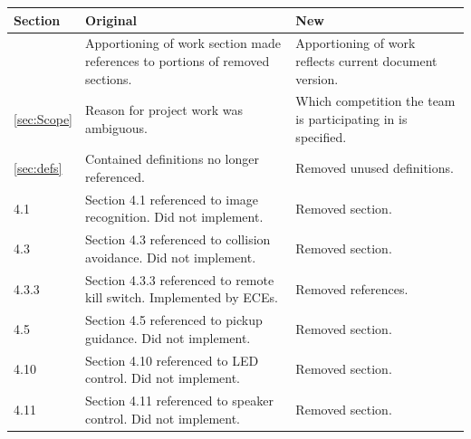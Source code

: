 \documentclass[onecolumn, oneside, letterpaper, draftclsnofoot, 10pt, compsoc]{IEEEtran}
\begin{document}
\begin{titlepage}
\begin{singlespace}
\begin{abstract}
        This design document outlines the overall software architecture of Oregon State University\textquotesingle s Micro Air Vehicle (MAV) system. It outlines the data the software will receive from the MAV\textquotesingle s onboard transmitter. Next, the document covers how the received data is processed, organized, and used by each software block. The data pipeline is described in detail, from the origin source, through each sorting and processing step, and finally to useful information displayed for pilot consumption. The design and layout of the GUI is also discussed, including the value of the displayed information to the pilot. Each facet of the MAV's software is covered.
        \end{abstract}
    \end{singlespace}
\end{titlepage}
\newpage
{}
\tableofcontents
\listoffigures

\newpage
\begin{center}
  \begin{tabular}{ | l | p{5cm} | p{5cm} | }
    \hline
    Section & Original & New \\ \hline
     & Apportioning of work section made references to portions of removed sections. & Apportioning of work reflects current document version. \\ \hline
    \ref{sec:Scope} & Reason for project work was ambiguous. & Which competition the team is participating in is specified. \\ \hline
    \ref{sec:defs} & Contained definitions no longer referenced. & Removed unused definitions. \\ \hline
    4.1 & Section 4.1 referenced to image recognition. Did not implement. & Removed section. \\ \hline
    4.3 & Section 4.3 referenced to collision avoidance. Did not implement. & Removed section. \\ \hline
    4.3.3 & Section 4.3.3 referenced to remote kill switch. Implemented by ECEs. & Removed references. \\ \hline
    4.5 & Section 4.5 referenced to pickup guidance. Did not implement. & Removed section. \\ \hline
    4.10 & Section 4.10 referenced to LED control. Did not implement. & Removed section. \\ \hline
    4.11 & Section 4.11 referenced to speaker control. Did not implement. & Removed section. \\ \hline
  \end{tabular}
\end{center}
\newpage
\end{document}
